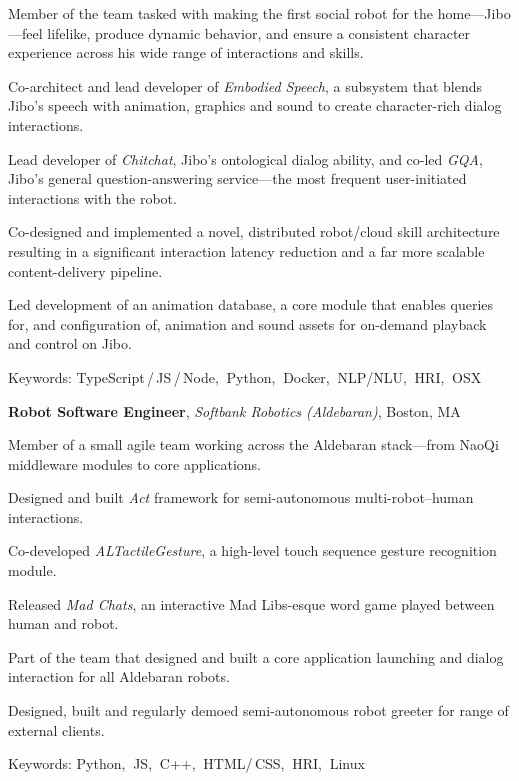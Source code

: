 \documentclass[10pt, letter]{article}
\newcommand{\years}[1]{\marginnote{\footnotesize #1}}
\newenvironment{desc*}{
  \begin{description}
    \setlength{\itemsep}{0.2pt}
    \setlength{\parskip}{-1pt}
    \setlength{\parsep}{0pt}
  }{
  \end{description}
}
\begin{document}
Member of the team tasked with making the first social robot for the home---Jibo---feel lifelike,
produce dynamic behavior, and ensure a consistent character experience across his wide range of
interactions and skills.
\begin{itemize}[leftmargin=*, rightmargin=1.5cm]
  {\light
\item Co-architect and lead developer of \textit{Embodied Speech}, a subsystem that blends Jibo's
  speech with animation, graphics and sound to create character-rich dialog interactions.
\item Lead developer of \textit{Chitchat}, Jibo's ontological dialog ability, and co-led
  \textit{GQA}, Jibo's general question-answering service---the most frequent user-initiated
  interactions with the robot.
\item Co-designed and implemented a novel, distributed robot/cloud skill architecture resulting in a
  significant interaction latency reduction and a far more scalable content-delivery pipeline.
\item Led development of an animation database, a core module that enables queries for, and
  configuration of, animation and sound assets for on-demand playback and control on Jibo.
  }
\end{itemize}
\vspace{-.2cm}
\begin{desc*}
\item[\rm \color{redblue} Keywords:] TypeScript\,/\,JS\,/\,Node,$\:$ Python,$\:$ Docker,$\:$ NLP/NLU,$\:$ HRI,$\:$ OSX\bigbreak
\end{desc*}

\years{2014 - 2016} 
\textbf{Robot Software Engineer},
\textit{Softbank Robotics (Aldebaran)}, Boston, MA\bigskip

Member of a small agile team working across the Aldebaran stack---from NaoQi middleware modules to core applications.
\begin{itemize}[leftmargin=*, parsep=1pt, rightmargin=1.5cm]
  {\light
\item Designed and built \textit{Act} framework for semi-autonomous
  multi-robot--human interactions.
\item Co-developed \textit{ALTactileGesture}, a high-level touch sequence
  gesture recognition module.
\item Released \textit{Mad Chats}, an interactive Mad Libs-esque word
  game played between human and robot.
\item Part of the team that designed and built a core
  application launching and dialog interaction for all
  Aldebaran robots.
\item Designed, built and regularly demoed semi-autonomous robot
  greeter for range of external clients.
  }
\end{itemize}
\begin{desc*}
\item[\rm \color{redblue} Keywords:] Python,$\:$ JS,$\:$ C++,$\:$ HTML/\,CSS,$\:$ HRI,$\:$
  Linux\bigbreak
\end{desc*}
\end{document}
